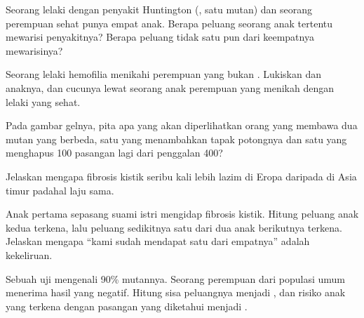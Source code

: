 \begin{exercise}[$\star\star$]\label{exo:g11:genes-and-disease:8}
Seorang lelaki dengan penyakit Huntington (, satu  mutan)
dan seorang perempuan sehat punya empat anak. Berapa peluang seorang
anak tertentu mewarisi penyakitnya? Berapa peluang tidak satu pun dari
keempatnya mewarisinya?
\end{exercise}

\begin{exercise}[$\star\star$]\label{exo:g11:genes-and-disease:9}
Seorang lelaki hemofilia menikahi perempuan yang bukan .
Lukiskan  dan  anaknya, dan  cucunya lewat
seorang anak perempuan yang menikah dengan lelaki yang sehat.
\end{exercise}

\begin{exercise}[$\star\star$]\label{exo:g11:genes-and-disease:10}
Pada gambar gelnya, pita apa yang akan diperlihatkan orang yang membawa
dua  mutan yang berbeda, satu yang menambahkan tapak potongnya dan
satu yang menghapus 100 pasangan  lagi dari penggalan 400?
\end{exercise}

\begin{exercise}[$\star\star$]\label{exo:g11:genes-and-disease:11}
Jelaskan mengapa fibrosis kistik seribu kali lebih lazim di Eropa
daripada di Asia timur padahal laju  sama.
\end{exercise}

\begin{exercise}[$\star\star\star$]\label{exo:g11:genes-and-disease:12}
Anak pertama sepasang suami istri mengidap fibrosis kistik. Hitung
peluang anak kedua terkena, lalu peluang sedikitnya satu dari dua anak
berikutnya terkena. Jelaskan mengapa ``kami sudah mendapat satu dari
empatnya'' adalah kekeliruan.
\end{exercise}

\begin{exercise}[$\star\star\star$]\label{exo:g11:genes-and-disease:13}
Sebuah uji  mengenali 90\%  mutannya. Seorang perempuan dari
populasi umum menerima hasil yang negatif. Hitung sisa peluangnya
menjadi , dan risiko anak yang terkena dengan pasangan yang
diketahui menjadi .
\end{exercise}

